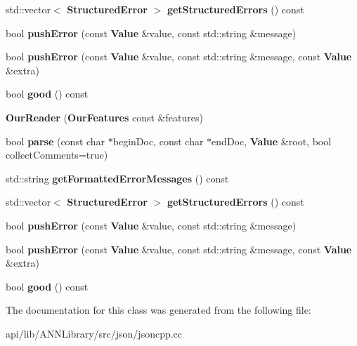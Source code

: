 \begin{DoxyCompactItemize}
\item 
std\+::vector$<$ {\bf Structured\+Error} $>$ {\bfseries get\+Structured\+Errors} () const \label{class_json_1_1_our_reader_a2f7d35771be02703be2d0ac1877bc149}

\item 
bool {\bfseries push\+Error} (const {\bf Value} \&value, const std\+::string \&message)\label{class_json_1_1_our_reader_aef7aa4ca22ffaa38c401b16951d20e1e}

\item 
bool {\bfseries push\+Error} (const {\bf Value} \&value, const std\+::string \&message, const {\bf Value} \&extra)\label{class_json_1_1_our_reader_ad43315cbb0d6804e3b7177e84a1ec53d}

\item 
bool {\bfseries good} () const \label{class_json_1_1_our_reader_a048346238d703ad9aed06beb686e6102}

\item 
{\bfseries Our\+Reader} ({\bf Our\+Features} const \&features)\label{class_json_1_1_our_reader_a48a850914b9c8d7781be172930c478e5}

\item 
bool {\bfseries parse} (const char $\ast$begin\+Doc, const char $\ast$end\+Doc, {\bf Value} \&root, bool collect\+Comments=true)\label{class_json_1_1_our_reader_aba4f8749aab7f02ec17f107e392caf80}

\item 
std\+::string {\bfseries get\+Formatted\+Error\+Messages} () const \label{class_json_1_1_our_reader_ae9cbb7dbd9c6c96be37432e8dfa1afcb}

\item 
std\+::vector$<$ {\bf Structured\+Error} $>$ {\bfseries get\+Structured\+Errors} () const \label{class_json_1_1_our_reader_a2f7d35771be02703be2d0ac1877bc149}

\item 
bool {\bfseries push\+Error} (const {\bf Value} \&value, const std\+::string \&message)\label{class_json_1_1_our_reader_aef7aa4ca22ffaa38c401b16951d20e1e}

\item 
bool {\bfseries push\+Error} (const {\bf Value} \&value, const std\+::string \&message, const {\bf Value} \&extra)\label{class_json_1_1_our_reader_ad43315cbb0d6804e3b7177e84a1ec53d}

\item 
bool {\bfseries good} () const \label{class_json_1_1_our_reader_a048346238d703ad9aed06beb686e6102}

\end{DoxyCompactItemize}


The documentation for this class was generated from the following file\+:\begin{DoxyCompactItemize}
\item 
api/lib/\+A\+N\+N\+Library/src/json/jsoncpp.\+cc\end{DoxyCompactItemize}
